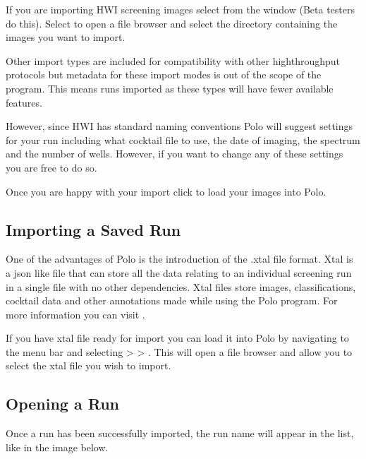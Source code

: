 \documentclass[letterpaper,10pt,english]{sphinxmanual}
\begin{document}
\noindent{}

If you are importing HWI screening images select  from
the  window (Beta testers do this). Select  to open
a file browser and select the directory containing the images you want to
import.

Other import types are included for compatibility with other
high\sphinxhyphen{}throughput protocols but metadata for these import modes is out of
the scope of the program. This means runs imported as these types will have
fewer available features.

However, since HWI has standard naming conventions Polo will suggest settings for your
run including what cocktail file to use, the date of imaging, the spectrum
and the number of wells. However, if you want to change any of these settings
you are free to do so.

Once you are happy with your import click  to load your
images into Polo.


\subsection{Importing a Saved Run}
\label{\detokenize{user_guide:importing-a-saved-run}}
One of the advantages of Polo is the introduction of the .xtal file format.
Xtal is a json like file that can store all the data relating to an individual
screening run in a single file with no other dependencies. Xtal files store
images, classifications, cocktail data and other annotations made while using
the Polo program. For more information you can visit .

If you have xtal file ready for import you can load it into Polo by navigating
to the menu bar and selecting  \sphinxhyphen{}\textgreater{}  \sphinxhyphen{}\textgreater{} .
This will open a file browser and allow you to select the xtal file you wish
to import.


\subsection{Opening a Run}
\label{\detokenize{user_guide:opening-a-run}}
Once a run has been successfully imported, the run name will appear in the
 list, like in the image below.
\end{document}
